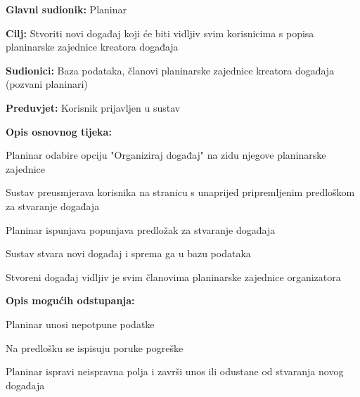 			\noindent {}
		\begin{packed_item}
			
			\item \textbf{Glavni sudionik: }$ $Planinar$ $
			\item  \textbf{Cilj:} $ $Stvoriti novi događaj koji će biti vidljiv svim korisnicima s popisa planinarske zajednice kreatora događaja$ $
			\item  \textbf{Sudionici:} $ $Baza podataka, članovi planinarske zajednice kreatora događaja (pozvani planinari)$ $
			\item  \textbf{Preduvjet:} $ $Korisnik prijavljen u sustav$ $
			\item  \textbf{Opis osnovnog tijeka:}
			
			\item[] \begin{packed_enum}
				
				\item $ $Planinar odabire opciju "Organiziraj događaj" na zidu njegove planinarske zajednice$ $
				\item $ $Sustav preusmjerava korisnika na stranicu s unaprijed pripremljenim predloškom za stvaranje događaja$ $
				\item $ $Planinar ispunjava popunjava predložak za stvaranje događaja$ $	
				\item $ $Sustav stvara novi događaj i sprema ga u bazu podataka$ $
				\item $ $Stvoreni događaj vidljiv je svim članovima planinarske zajednice organizatora$ $ 
			\end{packed_enum}
			\item  \textbf{Opis mogućih odstupanja:}
			
			\item[] \begin{packed_item}
				
				\item[3.a] $ $Planinar unosi nepotpune podatke$ $
				\item[] \begin{packed_enum}
					\item $ $Na predlošku se ispisuju poruke pogreške$ $
					\item $ $Planinar ispravi neispravna polja i završi unos ili odustane od stvaranja novog događaja$ $
				\end{packed_enum}
			\end{packed_item}
		\end{packed_item}
	
